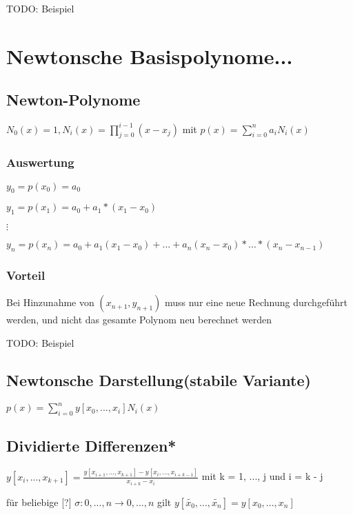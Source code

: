 \documentclass[12pt,a4paper]{article} %
\begin{document}
	
	TODO: Beispiel
	
	\newpage
	
	\section{Newtonsche Basispolynome...}
	
	\subsection{Newton-Polynome}
	
	$N_0(x) = 1, N_i(x) = \prod\limits_{j = 0}^{i - 1}(x - x_j)$ mit $p(x) = \sum\limits_{i = 0}^{n}a_iN_i(x)$
	
	\subsubsection{Auswertung}
	
	$y_0 = p(x_0) = a_0$
	
	$y_1 = p(x_1) = a_0 + a_1 * (x_1 - x_0)$
	
	$\vdots$
	
	$y_n = p(x_n) = a_0 + a_1(x_1 - x_0) + ... + a_n(x_n - x_0) * ... * (x_n - x_{n - 1})$
	
	\subsubsection{Vorteil}
	
	Bei Hinzunahme von $(x_{n + 1}, y_{n + 1})$ muss nur eine neue Rechnung durchgeführt werden, und nicht das gesamte Polynom neu berechnet werden
	
	TODO: Beispiel
	
	\subsection[Newtonsche Darstellung]{Newtonsche Darstellung(stabile Variante)}
	
	$p(x) = \sum\limits_{i = 0}^{n}y[x_0, ..., x_i] N_i(x)$
	
	\subsection{Dividierte Differenzen*}
	
	$y[x_i, ..., x_{k + 1}] = \frac{y[x_{i + 1}, ..., x_{k + 1}] - y[x_i, ..., x_{i + k - 1}]}{x_{i + k} - x_i}$ mit k = 1, ..., j und i = k - j
	
	für beliebige [?] $\sigma:{0, ..., n} \rightarrow {0, ..., n}$ gilt $y[\tilde{x_0}, ..., \tilde{x_n}] = y[x_0, ..., x_n]$
	
\end{document}
